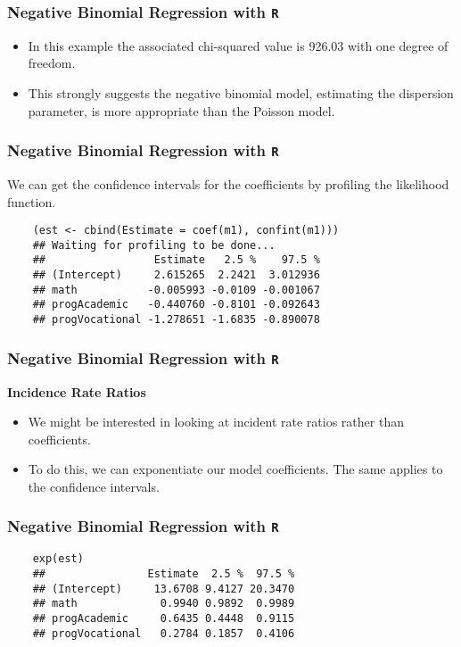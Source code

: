 \documentclass[MASTER.tex]{subfiles}
\begin{document}
\begin{frame}[fragile]
\frametitle{Negative Binomial Regression with \texttt{R} }
\large	
\begin{itemize}
\item		
In this example the associated chi-squared value is 926.03 with one degree of freedom. 
\item This strongly suggests the negative binomial model, estimating the dispersion parameter, is more appropriate than the Poisson model.
\end{itemize}
\end{frame}
\begin{frame}[fragile]
	\frametitle{Negative Binomial Regression with \texttt{R} }
	\large
	
	We can get the confidence intervals for the coefficients by profiling the likelihood function.
	\begin{verbatim}
	(est <- cbind(Estimate = coef(m1), confint(m1)))
	## Waiting for profiling to be done...
	##                 Estimate   2.5 %    97.5 %
	## (Intercept)     2.615265  2.2421  3.012936
	## math           -0.005993 -0.0109 -0.001067
	## progAcademic   -0.440760 -0.8101 -0.092643
	## progVocational -1.278651 -1.6835 -0.890078
	\end{verbatim}
	
\end{frame}
\begin{frame}[fragile]
	\frametitle{Negative Binomial Regression with \texttt{R} }
	\Large
\textbf{Incidence Rate Ratios}
\begin{itemize}
\item	We might be interested in looking at incident rate ratios rather than coefficients. 
\item To do this, we can exponentiate our model coefficients. The same applies to the confidence intervals.
\end{itemize}
\end{frame}
\begin{frame}[fragile]
	\frametitle{Negative Binomial Regression with \texttt{R} }
	\large
	\begin{verbatim}	
	exp(est)
	##                Estimate  2.5 %  97.5 %
	## (Intercept)     13.6708 9.4127 20.3470
	## math             0.9940 0.9892  0.9989
	## progAcademic     0.6435 0.4448  0.9115
	## progVocational   0.2784 0.1857  0.4106
	\end{verbatim}
\end{frame}
\end{document}
